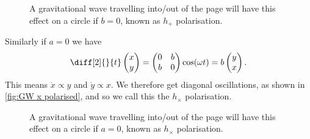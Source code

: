 \documentclass[fleqn]{NotesClass}
\begin{document}
    \begin{figure}
        \caption[Gravitational wave with \(h_+\) polarisation.]{A gravitational wave travelling into/out of the page will have this effect on a circle if \(b = 0\), known as \(h_+\) polarisation.}
        \label{fig:GW + polarised}
    \end{figure}
    
    Similarly if \(a = 0\) we have
    \begin{equation}
        \diff[2]{}{t}
        \begin{pmatrix}
            x\\ y
        \end{pmatrix}
        = 
        \begin{pmatrix}
            0 & b\\
            b & 0
        \end{pmatrix}
        \cos(\omega t) = b
        \begin{pmatrix}
            y\\ x
        \end{pmatrix}
        .
    \end{equation}
    This means \(\ddot{x} \propto y\) and \(\ddot{y} \propto x\).
    We therefore get diagonal oscillations, as shown in \cref{fig:GW x polarised}, and so we call this the \(h_{\times}\) polarisation.
    
    \begin{figure}
        \caption[Gravitational wave with \(h_{\times}\) polarisation.]{A gravitational wave travelling into/out of the page will have this effect on a circle if \(a = 0\), known as \(h_\times\) polarisation.}
    \end{figure}
    
    
    
    \appendixpage
    \begin{appendices}
        
    \end{appendices}
    
    \backmatter
    \renewcommand{\glossaryname}{Acronyms}
    \printglossary[acronym]
    \printindex
\end{document}

